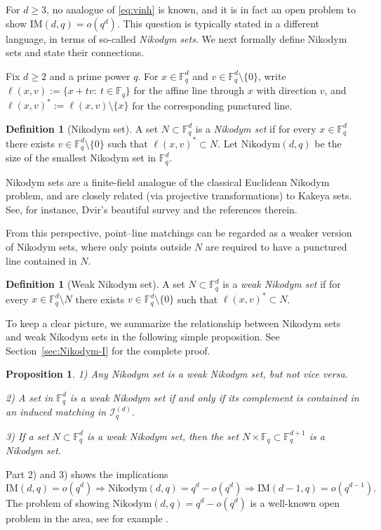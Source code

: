 \documentclass[12pt,reqno]{amsart}
\theoremstyle{plain}
\newtheorem{proposition}[theorem]{Proposition}
\theoremstyle{definition}
\newtheorem{definition}[theorem]{Definition}
\newcommand{\F}{\mathbb{F}}
\newcommand{\IM}{\mathrm{IM}}
\newcommand{\Nik}{\mathrm{Nikodym}}
\newcommand{\II}{\mathcal{I}}
\newcommand{\1}{\mathbf{1}}
\begin{document}
For $d\ge 3$, no analogue of \eqref{eq:vinh} is known, and it is in fact an open problem to show $\IM(d,q) = o(q^d)$. This question is typically stated in a different language, in terms of so-called {\it{Nikodym sets}}. We next formally define Nikodym sets and state their connections.

Fix $d\ge 2$ and a prime power $q$.
For $x\in\F_q^d$ and $v\in\F_q^d\setminus\{0\}$,
write
$
  \ell(x,v):=\{x+t v:\ t\in\F_q\}
$
for the affine line through $x$ with direction $v$, and
$
  \ell(x,v)^{\!*}:=\ell(x,v)\setminus\{x\}
$
for the corresponding punctured line.

\begin{definition}[Nikodym set]
A set $N\subset \F_q^d$ is a \emph{Nikodym set} if for every $x\in\F_q^d$ there exists
$v\in\F_q^d\setminus\{0\}$ such that $\ell(x,v)^{\!*}\subset N$. Let $\Nik(d, q)$ be the size of the smallest Nikodym set in $\F_q^d$.
\end{definition}

Nikodym sets are a finite-field analogue of the classical Euclidean Nikodym problem, and are closely related
(via projective transformations) to Kakeya sets. See, for instance, Dvir's beautiful survey \cite{dvir2012incidence} and the references therein.

From this perspective, point--line matchings can be regarded as a weaker version of Nikodym sets, where only points outside $N$ are required to have a punctured line contained in $N$. 

\begin{definition}[Weak Nikodym set]\label{def:weak-nik}
A set $N\subset \F_q^d$ is a \emph{weak Nikodym set} if for every $x\in \F_q^d\setminus N$
there exists $v\in\F_q^d\setminus\{0\}$ such that $\ell(x,v)^{\!*}\subset N$. 
\end{definition}
To keep a clear picture, we summarize the relationship between Nikodym sets and weak Nikodym sets in the following simple proposition. See Section~\ref{sec:Nikodym-I} for the complete proof.
\begin{proposition}
\label{prop:nikodym-basic}
1) Any Nikodym set is a weak Nikodym set, but not vice versa.

2) A set in $\F_q^d$ is a weak Nikodym set if and only if its complement is contained in an induced matching in $\II_q^{(d)}$.

3) If a set $N \subset \F_q^d$ is a weak Nikodym set, then the set $N \times \F_q \subset \F_q^{d + 1}$ is a Nikodym set.
\end{proposition}
Part 2) and 3) shows the implications $$\IM(d,q)=o(q^d) \Longrightarrow \Nik(d, q) =q^d-o(q^d) \Longrightarrow  \IM(d - 1,q) = o(q^{d - 1}).$$
The problem of showing $\Nik(d, q) =q^d-o(q^d)$ is a well-known open problem in the area, see for example \cite{LundSarafWolf2018}.
\end{document}
